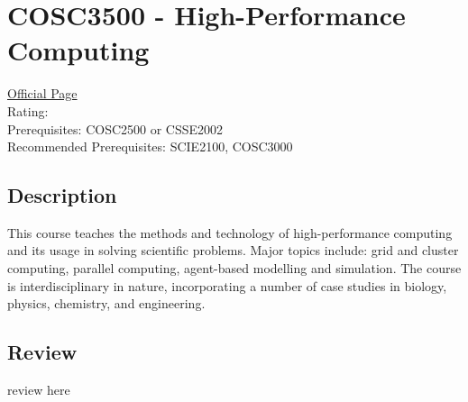 \hypertarget{COSC3500}{\section{COSC3500 - High-Performance Computing}}

\large
\textcolor{turbo_purple}{\href{https://my.uq.edu.au/programs-courses/course.html?course_code=COSC3500}{Official Page}} \\
Rating: \cstar\cstar\cstar\cstar\ostar \\
Prerequisites: COSC2500 or CSSE2002 \\
Recommended Prerequisites: SCIE2100, COSC3000

\normalsize
\subsection*{Description}
This course teaches the methods and technology of high-performance computing and its usage in solving scientific problems.
Major topics include: grid and cluster computing, parallel computing, agent-based modelling and simulation.
The course is interdisciplinary in nature, incorporating a number of case studies in biology, physics, chemistry, and engineering.

\subsection*{Review}
review here
